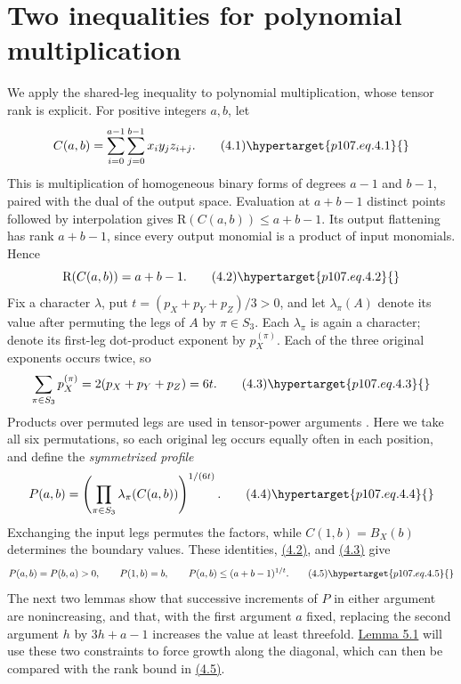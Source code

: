 \section{Two inequalities for polynomial multiplication}\hypertarget{p107.sec.4}{}
We apply the shared-leg inequality to polynomial multiplication, whose tensor rank is explicit. For positive integers $a,b$, let
\begin{equation}
C(a,b)=\sum_{i=0}^{a-1}\sum_{j=0}^{b-1}x_i y_j z_{i+j}.\tag{4.1}\hypertarget{p107.eq.4.1}{}
\end{equation}
This is multiplication of homogeneous binary forms of degrees $a-1$ and $b-1$, paired with the dual of the output space. Evaluation at $a+b-1$ distinct points followed by interpolation gives $\mathrm R(C(a,b))\le a+b-1$. Its output flattening has rank $a+b-1$, since every output monomial is a product of input monomials. Hence
\begin{equation}
\mathrm R(C(a,b))=a+b-1.\tag{4.2}\hypertarget{p107.eq.4.2}{}
\end{equation}
Fix a character $\lambda$, put $t=(p_X+p_Y+p_Z)/3>0$, and let $\lambda_\pi(A)$ denote its value after permuting the legs of $A$ by $\pi\in S_3$. Each $\lambda_\pi$ is again a character; denote its first-leg dot-product exponent by $p_X^{(\pi)}$. Each of the three original exponents occurs twice, so
\begin{equation}
\sum_{\pi\in S_3}p_X^{(\pi)}=2(p_X+p_Y+p_Z)=6t.\tag{4.3}\hypertarget{p107.eq.4.3}{}
\end{equation}
Products over permuted legs are used in tensor-power arguments \cite[Appendix A.3 of the full version]{r10}. Here we take all six permutations, so each original leg occurs equally often in each position, and define the \emph{symmetrized profile}
\begin{equation}
P(a,b)=\left(\prod_{\pi\in S_3}\lambda_\pi(C(a,b))\right)^{1/(6t)}.\tag{4.4}\hypertarget{p107.eq.4.4}{}
\end{equation}
Exchanging the input legs permutes the factors, while $C(1,b)=B_X(b)$ determines the boundary values. These identities, \hyperlink{p107.eq.4.2}{(4.2)}, and \hyperlink{p107.eq.4.3}{(4.3)} give
\begin{equation}
P(a,b)=P(b,a)>0,\qquad P(1,b)=b,\qquad P(a,b)\le(a+b-1)^{1/t}.\tag{4.5}\hypertarget{p107.eq.4.5}{}
\end{equation}
The next two lemmas show that successive increments of $P$ in either argument are nonincreasing, and that, with the first argument $a$ fixed, replacing the second argument $h$ by $3h+a-1$ increases the value at least threefold. \hyperlink{p107.result.5.1}{Lemma 5.1} will use these two constraints to force growth along the diagonal, which can then be compared with the rank bound in \hyperlink{p107.eq.4.5}{(4.5)}.


